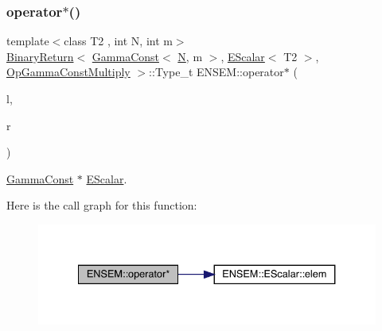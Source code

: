 \subsubsection{\texorpdfstring{operator$\ast$()}{operator*()}\hspace{0.1cm}{\footnotesize\ttfamily [2/9]}}
{\footnotesize\ttfamily template$<$class T2 , int N, int m$>$ \\
\mbox{\hyperlink{structENSEM_1_1BinaryReturn}{Binary\+Return}}$<$ \mbox{\hyperlink{classENSEM_1_1GammaConst}{Gamma\+Const}}$<$ \mbox{\hyperlink{operator__name__util_8cc_a7722c8ecbb62d99aee7ce68b1752f337}{N}}, m $>$, \mbox{\hyperlink{classENSEM_1_1EScalar}{E\+Scalar}}$<$ T2 $>$, \mbox{\hyperlink{structENSEM_1_1OpGammaConstMultiply}{Op\+Gamma\+Const\+Multiply}} $>$\+::Type\+\_\+t E\+N\+S\+E\+M\+::operator$\ast$ (\begin{DoxyParamCaption}\item[{const \mbox{\hyperlink{classENSEM_1_1GammaConst}{Gamma\+Const}}$<$ \mbox{\hyperlink{operator__name__util_8cc_a7722c8ecbb62d99aee7ce68b1752f337}{N}}, m $>$ \&}]{l,  }\item[{const \mbox{\hyperlink{classENSEM_1_1EScalar}{E\+Scalar}}$<$ T2 $>$ \&}]{r }\end{DoxyParamCaption})\hspace{0.3cm}{\ttfamily [inline]}}



\mbox{\hyperlink{classENSEM_1_1GammaConst}{Gamma\+Const}} $\ast$ \mbox{\hyperlink{classENSEM_1_1EScalar}{E\+Scalar}}. 

Here is the call graph for this function\+:
\nopagebreak
\begin{figure}[H]
\begin{center}
\leavevmode
\includegraphics[width=334pt]{d4/dca/group__escalar_gae8dabaf2e8ff409632f9943294b5a6b4_cgraph}
\end{center}
\end{figure}
\mbox{\label{group__escalar_ga10de70ea3b5491035fab4f67de013321}} 
